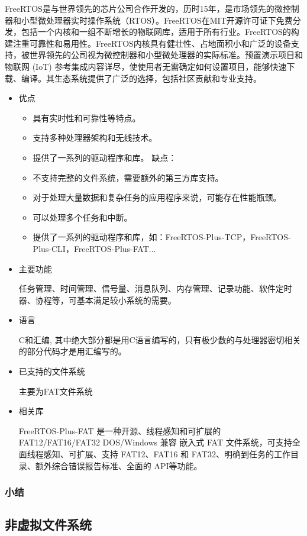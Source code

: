 \documentclass[UTF8,a4paper]{ctexart}
\begin{document}
FreeRTOS是与世界领先的芯片公司合作开发的，历时15年，是市场领先的微控制器和小型微处理器实时操作系统（RTOS）。FreeRTOS在MIT开源许可证下免费分发，包括一个内核和一组不断增长的物联网库，适用于所有行业。FreeRTOS的构建注重可靠性和易用性。FreeRTOS内核具有健壮性、占地面积小和广泛的设备支持，被世界领先的公司视为微控制器和小型微处理器的实际标准。预置演示项目和物联网 (IoT) 参考集成内容详尽，使使用者无需确定如何设置项目，能够快速下载、编译。其生态系统提供了广泛的选择，包括社区贡献和专业支持。
\begin{itemize}
\item 优点
\begin{itemize}
    \item 具有实时性和可靠性等特点。
    \item 支持多种处理器架构和无线技术。
    \item 提供了一系列的驱动程序和库。 缺点：
    \item 不支持完整的文件系统，需要额外的第三方库支持。
    \item 对于处理大量数据和复杂任务的应用程序来说，可能存在性能瓶颈。 
    \item 可以处理多个任务和中断。
    \item 提供了一系列的驱动程序和库，如：FreeRTOS-Plus-TCP，FreeRTOS-Plus-CLI，FreeRTOS-Plus-FAT...    
\end{itemize}
\item 主要功能

任务管理、时间管理、信号量、消息队列、内存管理、记录功能、软件定时器、协程等，可基本满足较小系统的需要。
\item 语言

C和汇编, 其中绝大部分都是用C语言编写的，只有极少数的与处理器密切相关的部分代码才是用汇编写的。
\item 已支持的文件系统

主要为FAT文件系统
\item 相关库

FreeRTOS-Plus-FAT 是一种开源、线程感知和可扩展的 FAT12/FAT16/FAT32 DOS/Windows 兼容 嵌入式 FAT 文件系统，可支持全面线程感知、可扩展、支持 FAT12、FAT16 和 FAT32、明确到任务的工作目录、额外综合错误报告标准、全面的 API等功能。
\end{itemize}
\subsubsection{小结}

\subsection{非虚拟文件系统}
\end{document}
